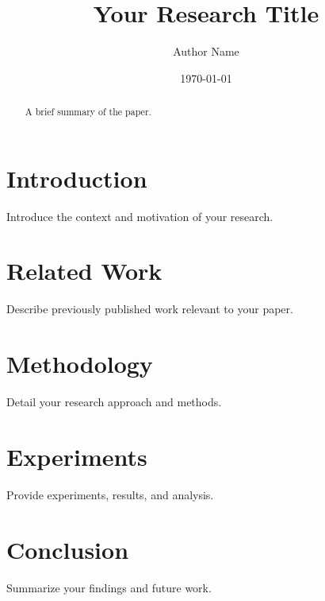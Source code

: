 \documentclass{article}
\title{Your Research Title}
\author{Author Name}
\date{\today}
\begin{document}
\maketitle

\begin{abstract}
A brief summary of the paper.
\end{abstract}

\section{Introduction}
Introduce the context and motivation of your research.

\section{Related Work}
Describe previously published work relevant to your paper.

\section{Methodology}
Detail your research approach and methods.

\section{Experiments}
Provide experiments, results, and analysis.

\section{Conclusion}
Summarize your findings and future work.



\end{document}
